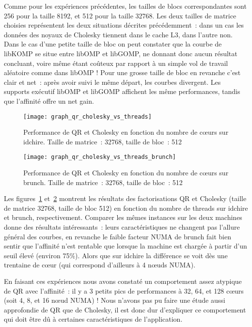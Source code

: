 Comme pour les expériences précédentes, les tailles de blocs correspondantes sont 256 pour la taille 8192, et 512 pour la taille 32768.
Les deux tailles de matrice choisies représentent les deux situations décrites précédemment~: dans un cas les données des noyaux de Cholesky tiennent dans le cache L3, dans l'autre non.
Dans le cas d'une petite taille de bloc on peut constater que la courbe de libKOMP se situe entre libOMP et libGOMP, ne donnant donc aucun résultat concluant, voire même étant coûteux par rapport à un simple vol de travail aléatoire comme dans libOMP !
Pour une grosse taille de bloc en revanche c'est clair et net~: après avoir suivi le même départ, les courbes divergent. Les supports exécutif libOMP et libGOMP affichent les même performances, tandis que l'affinité offre un net gain.

\begin{figure}[t!]
  \centering
  \texttt{[image: graph\_qr\_cholesky\_vs\_threads]}
  \caption{Performance de QR et Cholesky en fonction du nombre de cœurs sur idchire. Taille de matrice~: 32768, taille de bloc~: 512}\label{fig:contribs:perf_eval:eval-qr-cholesky-idchire}
\end{figure}
\begin{figure}[h!]
  \centering
  \texttt{[image: graph\_qr\_cholesky\_vs\_threads\_brunch]}
  \caption{Performance de QR et Cholesky en fonction du nombre de cœurs sur brunch. Taille de matrice~: 32768, taille de bloc~: 512}\label{fig:contribs:perf_eval:eval-qr-cholesky-brunch}
\end{figure}

Les figures~\ref{fig:contribs:perf_eval:eval-qr-cholesky-idchire} et~\ref{fig:contribs:perf_eval:eval-qr-cholesky-brunch} montrent les résultats des factorisations QR et Cholesky (taille de matrice 32768, taille de bloc 512) en fonction du nombre de threads sur idchire et brunch, respectivement.
Comparer les mêmes instances sur les deux machines donne des résultats intéressants~: leurs caractéristiques ne changent pas l'allure général des courbes, en revanche le faible facteur NUMA de brunch fait bien sentir que l'affinité n'est rentable que lorsque la machine est chargée à partir d'un seuil élevé (environ 75\%).
Alors que sur idchire la différence se voit dès une trentaine de cœur (qui correspond d'ailleurs à 4 nœuds NUMA).

En faisant ces expériences nous avons constaté un comportement assez atypique de QR avec l'affinité~: il y a 3 petits pics de performances à 32, 64, et 128 cœurs (soit 4, 8, et 16 nœud NUMA) !
Nous n'avons pas pu faire une étude aussi approfondie de QR que de Cholesky, il est donc dur d'expliquer ce comportement qui doit être dû à certaines caractéristiques de l'application.

